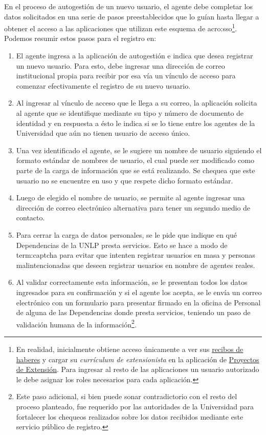 En el proceso de autogestión de un nuevo usuario, el agente debe completar los datos solicitados en una serie de pasos preestablecidos que lo guían hasta llegar a obtener el acceso a las aplicaciones que utilizan este esquema de \gls{acro:sso}\footnote{En realidad, inicialmente obtiene acceso únicamente a ver sus \hyperref[anexo:detalle-clientes:recibos]{recibos de haberes} y cargar su \textit{currículum de extensionista} en la aplicación de \hyperref[anexo:detalle-clientes:extension]{Proyectos de Extensión}. Para ingresar al resto de las aplicaciones un usuario autorizado le debe asignar los roles necesarios para cada aplicación.}. Podemos resumir estos pasos para el registro en:

\begin{enumerate}
  \item El agente ingresa a la aplicación de autogestión e indica que desea registrar un nuevo usuario. Para esto, debe ingresar una dirección de correo institucional propia para recibir por esa vía un vínculo de acceso para comenzar efectivamente el registro de su nuevo usuario.

  \item Al ingresar al vínculo de acceso que le llega a su correo, la aplicación solicita al agente que se identifique mediante su tipo y número de documento de identidad y en respuesta a ésto le indica si se lo tiene entre los agentes de la Universidad que aún no tienen usuario de acceso único.

  \item Una vez identificado el agente, se le sugiere un nombre de usuario siguiendo el formato estándar de nombres de usuario, el cual puede ser modificado como parte de la carga de información que se está realizando. Se chequea que este usuario no se encuentre en uso y que respete dicho formato estándar.

  \item Luego de elegido el nombre de usuario, se permite al agente ingresar una dirección de correo electrónico alternativa para tener un segundo medio de contacto.

  \item Para cerrar la carga de datos personales, se le pide que indique en qué Dependencias de la UNLP presta servicios. Esto se hace a modo de \gls{term:captcha} para evitar  que intenten registrar usuarios en masa y personas malintencionadas que deseen registrar usuarios en nombre de agentes reales.

  \item Al validar correctamente esta información, se le presentan todos los datos ingresados para su confirmación y si el agente los acepta, se le envía un correo electrónico con un formulario para presentar firmado en la oficina de Personal de alguna de las Dependencias donde presta servicios, teniendo un paso de validación humana de la información\footnote{Este paso adicional, si bien puede sonar contradictorio con el resto del proceso  planteado, fue requerido por las autoridades de la Universidad para fortalecer los chequeos realizados sobre los datos recibidos mediante este servicio público de registro.}.


\end{enumerate}
